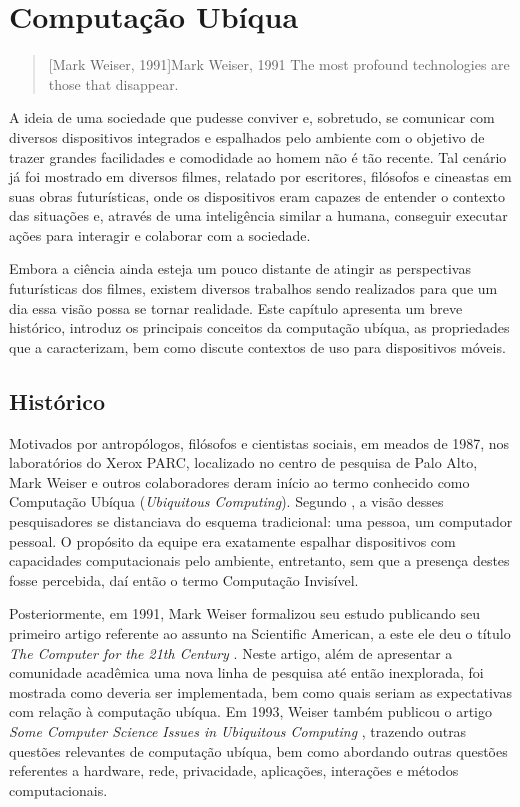 \chapter{Computação Ubíqua}
\label{ch:computacaoUbiqua}

\begin{quotation}[Mark Weiser, 1991]{Mark Weiser, 1991}
The most profound technologies are those that disappear.
\end{quotation}

A ideia de uma sociedade que pudesse conviver e, sobretudo, se comunicar com diversos dispositivos integrados e espalhados pelo ambiente com o objetivo de trazer grandes facilidades e comodidade ao homem não é tão recente. Tal cenário já foi mostrado em diversos filmes, relatado por escritores, filósofos e cineastas em suas obras futurísticas, onde os dispositivos eram capazes de entender o contexto das situações e, através de uma inteligência similar a humana, conseguir executar ações para interagir e colaborar com a sociedade.

Embora a ciência ainda esteja um pouco distante de atingir as perspectivas futurísticas dos filmes, existem diversos trabalhos sendo realizados para que um dia essa visão possa se tornar realidade. Este capítulo apresenta um breve histórico, introduz os principais conceitos da computação ubíqua,  as propriedades que a caracterizam, bem como discute contextos de uso para dispositivos móveis.      



\section{Histórico}
\label{sc:historico}

Motivados por antropólogos, filósofos e cientistas sociais, em meados de 1987, nos laboratórios do Xerox PARC, localizado no centro de pesquisa de Palo Alto, Mark Weiser e outros colaboradores deram início ao termo conhecido como Computação Ubíqua (\textit{Ubiquitous Computing}). Segundo \cite{campiolo2005} , a visão desses pesquisadores se distanciava do esquema tradicional: uma pessoa, um computador pessoal. O propósito da equipe era exatamente espalhar dispositivos com capacidades computacionais pelo ambiente, entretanto, sem que a presença destes fosse percebida, daí então o termo Computação Invisível. 

Posteriormente, em 1991, Mark Weiser formalizou seu estudo publicando  seu primeiro artigo referente ao assunto na Scientific American, a este ele deu o título \textit{The Computer for the 21th Century} \citep{weiser1991}. Neste artigo, além de  apresentar a comunidade acadêmica uma nova linha de pesquisa até então inexplorada, foi mostrada como deveria ser implementada, bem como quais seriam as expectativas com relação à computação ubíqua. Em 1993, Weiser também publicou o artigo \textit{Some Computer Science Issues in Ubiquitous Computing} \citep{weiser1993}, trazendo outras questões relevantes de computação ubíqua, bem como abordando outras questões referentes a hardware, rede, privacidade, aplicações, interações e métodos computacionais. 


